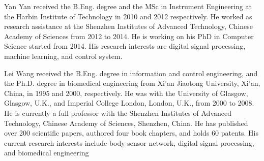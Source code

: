 \documentclass[journal]{IEEEtran}
\begin{document}
\begin{IEEEbiography}{Yan Yan}
received the B.Eng. degree and the MSc in Instrument Engineering at the Harbin Institute of Technology in 2010 and 2012 respectively. 
He worked as research assistance at the Shenzhen Institutes of Advanced Technology, Chinese Academy of Sciences from 2012 to 2014. 
He is working on his PhD in Computer Science started from 2014.
His research interests are digital signal processing, machine learning, and control system.
\end{IEEEbiography}

\begin{IEEEbiography}{Lei Wang}
received the B.Eng. degree in information and control engineering, and the Ph.D. degree in biomedical engineering from Xi’an Jiaotong University, Xi’an, China, in 1995 and 2000, respectively. He was with the University of Glasgow, Glasgow, U.K., and Imperial College London, London, U.K., from 2000 to 2008. He is currently a full professor with the Shenzhen Institutes of Advanced Technology, Chinese Academy of Sciences, Shenzhen, China. He has published over 200 scientific papers, authored four book chapters, and holds 60 patents. His current research interests include body sensor network, digital signal processing, and biomedical engineering
\end{IEEEbiography}









\end{document}
